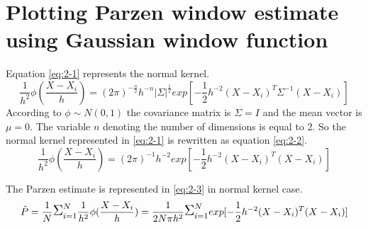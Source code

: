 \documentclass[12pt]{article}
\begin{document}
\section{Plotting Parzen window estimate using Gaussian window function}
Equation \eqref{eq:2-1} represents the normal kernel.
\begin{equation}
\frac{1}{h^2}\phi(\frac{X-X_i}{h}) = (2\pi)^{-\frac{n}{2}}h^{-n}|\Sigma|^{\frac{1}{2}}exp[-\frac{1}{2}h^{-2}(X-X_i)^T\Sigma^{-1}(X-X_i)]
\label{eq:2-1}
\end{equation}
According to $\phi \sim N(0,1)$ the covariance matrix is $\Sigma = I$ and the mean vector is $\mu = 0$. The variable $n$ denoting the number of dimensions is equal to 2. So the normal kernel represented in \eqref{eq:2-1} is rewritten as equation \eqref{eq:2-2}.
\begin{equation}
\frac{1}{h^2}\phi(\frac{X-X_i}{h}) = (2\pi)^{-1}h^{-2}exp[-\frac{1}{2}h^{-2}(X-X_i)^T(X-X_i)]
\label{eq:2-2}
\end{equation}

The Parzen estimate is represented in \eqref{eq:2-3} in normal kernel case.
\begin{equation}
\hat{P} = \frac{1}{N}\mathlarger{\mathlarger{\Sigma}}_{i=1}^N \frac{1}{h^2}\phi(\frac{X-X_i}{h}) = \frac{1}{2N\pi h^2}\mathlarger{\mathlarger{\Sigma}}_{i=1}^Nexp[-\frac{1}{2}h^{-2}(X-X_i)^T(X-X_i)]
\label{eq:2-3}
\end{equation}
\end{document}
